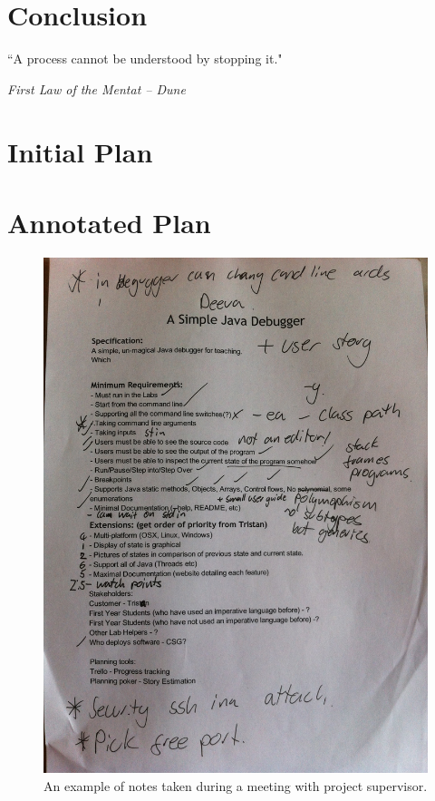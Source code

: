 \documentclass[11pt, a4paper]{article}
\newlength\longest
\begin{document}
\section{Conclusion}


\clearpage
\thispagestyle{empty}
\null\vfill
\begin{center}
\settowidth{}
\parbox{\longest}{%
  \raggedright{%
  ``A process cannot be understood by stopping it." \\
  }
  \raggedright{\emph{First Law of the Mentat -- Dune}}\par%
}
\end{center}
\vfill\vfill
\clearpage

\appendix
\section{Initial Plan}
\label{sec:initialplan}


\section{Annotated Plan}
\begin{figure}[h!]
\centering
\includegraphics[width=\textwidth]{annotatedreport.jpg}
\caption{An example of notes taken during a meeting with project supervisor.}
\end{figure}
\end{document}
